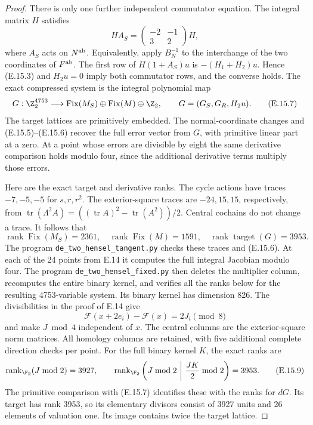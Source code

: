 \begin{proof}
There is only one further independent commutator equation.
The integral matrix $H$ satisfies
\[
 H A_S=\begin{pmatrix}-2&-1\\3&2\end{pmatrix}H,
 \tag{E.15.6}
\]
where $A_S$ acts on $N^{\rm ab}$. Equivalently, apply
$B_N^{-1}$ to the interchange of the two coordinates
of $F^{\rm ab}$. The first row of $H(1+A_S)u$ is
$-(H_1+H_2)u$. Hence (E.15.3) and $H_2u=0$ imply
both commutator rows, and the converse holds. The exact
compressed system is the integral polynomial map
\[
 G:\Z_2^{4753}\longrightarrow
 \operatorname{Fix}(M_S)\oplus\operatorname{Fix}(M)\oplus\Z_2,
 \qquad G=(G_S,G_R,H_2u).
 \tag{E.15.7}
\]
The target lattices are primitively embedded. The
normal-coordinate changes and (E.15.5)--(E.15.6) recover
the full error vector from $G$, with primitive linear
part at a zero. At a point whose errors are divisible
by eight the same derivative comparison holds modulo
four, since the additional derivative terms multiply
those errors.

Here are the exact target and derivative ranks.
The cycle actions have traces $-7,-5,-5$ for $s,r,r^2$.
The exterior-square traces are $-24,15,15$, respectively,
from
$\operatorname{tr}(\Lambda^2A)=
((\operatorname{tr}A)^2-\operatorname{tr}(A^2))/2$.
Central cochains do not change a trace. It follows that
\[
 \operatorname{rank}\operatorname{Fix}(M_S)=2361,
 \quad \operatorname{rank}\operatorname{Fix}(M)=1591,
 \quad \operatorname{rank}\operatorname{target}(G)=3953.
 \tag{E.15.8}
\]
The program \texttt{de\_two\_hensel\_tangent.py}
checks these traces and (E.15.6). At each of the 24
points from E.14 it computes the full integral Jacobian
modulo four. The program \texttt{de\_two\_hensel\_fixed.py}
then deletes the multiplier column, recomputes the entire
binary kernel, and verifies all the ranks below for the
resulting 4753-variable system. Its binary kernel has
dimension 826. The divisibilities in the proof of E.14
give
\[
 \mathcal F(x+2e_i)-\mathcal F(x)=2J_i\pmod8
\]
and make $J\bmod4$ independent of $x$. The central
columns are the exterior-square norm matrices. All
homology columns are retained, with
five additional complete direction checks per point.
For the full binary kernel $K$, the exact ranks are
\[
 \operatorname{rank}_{\F_2}(J\bmod2)=3927,\qquad
 \operatorname{rank}_{\F_2}
 \left(J\bmod2\ \middle|\ \frac{JK}{2}\bmod2\right)=3953.
 \tag{E.15.9}
\]
The primitive comparison with (E.15.7) identifies these
with the ranks for $dG$. Its target has rank 3953, so
its elementary divisors consist of 3927 units and 26
elements of valuation one. Its image contains twice
the target lattice.


\end{proof}
